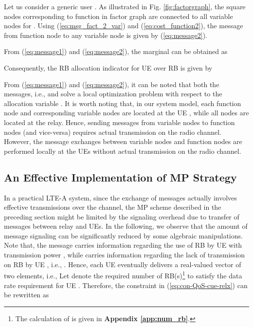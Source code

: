 \documentclass[twocolumn,10pt]{IEEEtran}
\begin{document}
Let us consider a generic user . As illustrated in Fig. \ref{fig:factorgraph}, the square nodes corresponding to function  in factor graph are connected to all variable nodes  for . Using (\ref{eq:msg_fact_2_var}) and (\ref{eq:cost_function2}),  the message from  function node  to any variable node  is given by (\ref{eq:message2}).

\begin{figure*}[!t]
\normalsize




\hrulefill
\vspace*{4pt}
\end{figure*}


From (\ref{eq:message1}) and (\ref{eq:message2}), the marginal   can be obtained as

Consequently, the RB allocation indicator for UE  over RB  is given by


From (\ref{eq:message1}) and (\ref{eq:message2}),  it can be noted that both the messages, i.e.,  and  solve a local optimization problem with respect to the allocation variable . It is worth noting that, in our system model,  each  function node  and corresponding variable nodes are located at the UE , while all  nodes are located at the relay. Hence, sending messages  from variable nodes to  function nodes (and vice-versa) requires actual transmission on the radio channel. However, the message exchanges between variable nodes and  function nodes  are performed locally at the UEs without actual transmission on the radio channel.

\subsection{An Effective Implementation of MP Strategy}

In a practical LTE-A system, since the exchange of messages actually involves effective transmissions over the channel, the MP scheme described in the preceding section might be limited by the signaling overhead  due to transfer of messages between relay and UEs. In the following, we observe that the amount of message signaling can be significantly reduced by some algebraic manipulations. Note that, the message  carries information regarding the use of RB  by UE  with transmission power , while  carries information regarding the lack of transmission on RB  by UE , i.e., . Hence, each UE eventually delivers a real-valued vector of two elements, i.e.,  Let  denote the required number of RB(s)\footnote{The calculation of  is given in \textbf{Appendix \ref{app:num_rb}}.} to satisfy the data rate requirement  for UE . Therefore, the constraint in (\ref{eq:con-QoS-cue-relx}) can be rewritten as 
\end{document}
